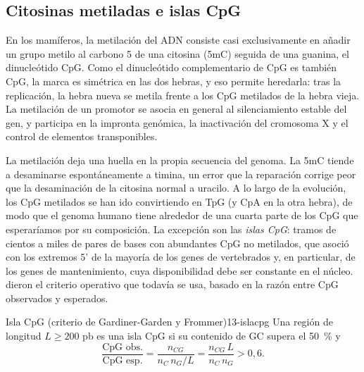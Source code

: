 \subsection{Citosinas metiladas e islas CpG}

En los mamíferos, la metilación del ADN consiste casi exclusivamente en añadir un grupo metilo al carbono 5 de una citosina (5mC) seguida de una guanina, el dinucleótido CpG. Como el dinucleótido complementario de CpG es también CpG, la marca es simétrica en las dos hebras, y eso permite heredarla: tras la replicación, la hebra nueva se metila frente a los CpG metilados de la hebra vieja. La metilación de un promotor se asocia en general al silenciamiento estable del gen, y participa en la impronta genómica, la inactivación del cromosoma X y el control de elementos transponibles.

La metilación deja una huella en la propia secuencia del genoma. La 5mC tiende a desaminarse espontáneamente a timina, un error que la reparación corrige peor que la desaminación de la citosina normal a uracilo. A lo largo de la evolución, los CpG metilados se han ido convirtiendo en TpG (y CpA en la otra hebra), de modo que el genoma humano tiene alrededor de una cuarta parte de los CpG que esperaríamos por su composición. La excepción son las \emph{islas CpG}: tramos de cientos a miles de pares de bases con abundantes CpG no metilados, que \textcite{c13-bird1986} asoció con los extremos 5' de la mayoría de los genes de vertebrados y, en particular, de los genes de mantenimiento, cuya disponibilidad debe ser constante en el núcleo. \textcite{c13-gardinergarden1987} dieron el criterio operativo que todavía se usa, basado en la razón entre CpG observados y esperados.

\begin{definicion}{Isla CpG (criterio de Gardiner-Garden y Frommer)}{13-islacpg}
Una región de longitud $L\ge200$ pb es una isla CpG si su contenido de GC supera el \SI{50}{\percent} y
\begin{equation}\label{eq:13-oe}
\frac{\text{CpG obs.}}{\text{CpG esp.}} = \frac{n_{CG}}{n_C\,n_G/L} = \frac{n_{CG}\,L}{n_C\,n_G} > 0{,}6 .
\end{equation}
\end{definicion}

\begin{simbolos}
\end{simbolos}

